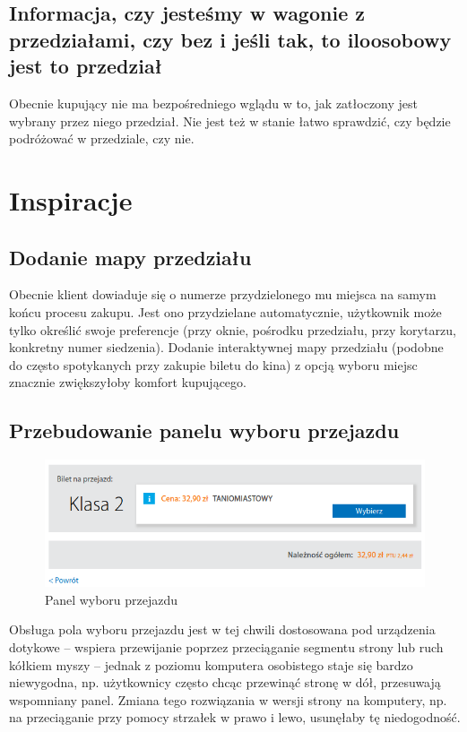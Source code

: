 \documentclass{article}
\begin{document}
\subsection{Informacja, czy jesteśmy w wagonie z przedziałami, czy bez i jeśli tak, to iloosobowy jest to przedział}
Obecnie kupujący nie ma bezpośredniego wglądu w to, jak zatłoczony jest wybrany przez niego przedział. Nie jest też w stanie łatwo sprawdzić, czy będzie podróżować w przedziale, czy nie.

\section{Inspiracje}
\subsection{Dodanie mapy przedziału}
Obecnie klient dowiaduje się o numerze przydzielonego mu miejsca na samym końcu procesu zakupu.
Jest ono przydzielane automatycznie, użytkownik może tylko określić swoje preferencje (przy oknie, pośrodku przedziału,
przy korytarzu, konkretny numer siedzenia). Dodanie interaktywnej mapy przedziału (podobne do często spotykanych przy
zakupie biletu do kina) z opcją wyboru miejsc znacznie zwiększyłoby komfort kupującego.

\subsection{Przebudowanie panelu wyboru przejazdu}
\begin{figure}[ht]
\centering
\includegraphics[width=\textwidth]{img/wybor_przejazdu.png}
\caption{Panel wyboru przejazdu}
\label{panel_wyboru_przejazdu}
\end{figure}
Obsługa pola wyboru przejazdu jest w tej chwili dostosowana pod urządzenia
dotykowe -- wspiera przewijanie poprzez przeciąganie segmentu strony lub ruch kółkiem myszy -- jednak
z poziomu komputera osobistego staje się bardzo niewygodna, np. użytkownicy często chcąc przewinąć
stronę w dół, przesuwają wspomniany panel. Zmiana tego rozwiązania w wersji strony na komputery, np. na
przeciąganie przy pomocy strzałek w prawo i lewo, usunęłaby tę niedogodność.
\end{document}

